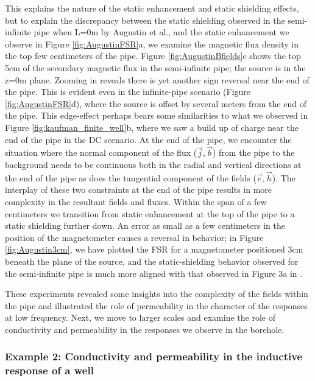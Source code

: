 This explains the nature of the static enhancement and static shielding effects, but to explain the discrepancy between the static shielding observed in the semi-infinite pipe when L=0m by Augustin et al., and the static enhancement we observe in Figure \ref{fig:AugustinFSR}a, we examine the magnetic flux density in the top few centimeters of the pipe. Figure \ref{fig:AugustinBfields}c shows the top 5cm of the secondary magnetic flux in the semi-infinite pipe; the source is in the z=0m plane.  Zooming in reveals there is yet another sign reversal near the end of the pipe. This is evident even in the infinite-pipe scenario (Figure \ref{fig:AugustinFSR}d), where the source is offset by several meters from the end of the pipe. This edge-effect perhaps bears some similarities to what we observed in Figure \ref{fig:kaufman_finite_well}b, where we saw a build up of charge near the end of the pipe in the DC scenario. At the end of the pipe, we encounter the situation where the normal component of the flux ($\vec{j}, \vec{b}$) from the pipe to the background needs to be continuous both in the radial and vertical directions at the end of the pipe as does the tangential component of the fields ($\vec{e}, \vec{h}$). The interplay of these two constraints at the end of the pipe results in more complexity in the resultant fields and fluxes. Within the span of a few centimeters we transition from static enhancement at the top of the pipe to a static shielding further down. An error as small as a few centimeters in the position of the magnetometer causes a reversal in behavior; in Figure \ref{fig:Augustin3cm}, we have plotted the FSR for a magnetometer positioned 3cm beneath the plane of the source, and the static-shielding behavior observed for the semi-infinite pipe is much more aligned with that observed in Figure 3a in \cite{Augustin1989}.






These experiments revealed some insights into the complexity of the fields within the pipe and illustrated the role of permeability in the character of the responses at low frequency. Next, we move to larger scales and examine the role of conductivity and permeability in the responses we observe in the borehole.

\subsubsection{Example 2: Conductivity and permeability in the inductive response of a well}

